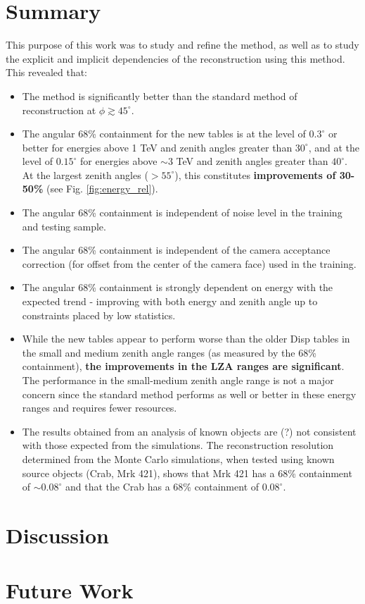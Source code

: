 \documentclass[main.tex]{subfiles}
\begin{document}
\section{Summary}
This purpose of this work was to study and refine the \disp method, as well as to study the explicit and implicit dependencies of the reconstruction using this method. This revealed that:

\begin{itemize}
\item The \disp method is significantly better than the standard method of reconstruction at $\phi\gtrsim45^\circ$.
\item The angular 68\% containment for the new \disp tables is at the level of $0.3^\circ$ or better for energies above 1 TeV and zenith angles greater than $30^\circ$, and at the level of $0.15^\circ$ for energies above $\sim$3 TeV and zenith angles greater than $40^\circ$. At the largest zenith angles ($>55^\circ$), this constitutes {\bf improvements of 30-50\%} (see Fig. \ref{fig:energy_rel}).
\item The angular 68\% containment is independent of noise level in the training and testing sample.
\item The angular 68\% containment is independent of the camera acceptance correction (for offset from the center of the camera face) used in the training.
\item The angular 68\% containment is strongly dependent on energy with the expected trend - improving with both energy and zenith angle up to constraints placed by low statistics.
\item While the new \disp tables appear to perform worse than the older Disp tables in the small and medium zenith angle ranges (as measured by the 68\% containment), \textbf{the improvements in the LZA ranges are significant}. The performance in the small-medium zenith angle range is not a major concern since the standard method performs as well or better in these energy ranges and requires fewer resources.
\item The results obtained from an analysis of known objects are (?)  not consistent with those expected from the simulations. The reconstruction resolution determined from the Monte Carlo simulations, when tested using known source objects (Crab, Mrk 421), shows that Mrk 421 has a 68\% containment of $\sim 0.08^\circ$ and that the Crab has a 68\% containment of $0.08^\circ$.
\end{itemize}

\section{Discussion}


\section{Future Work}
\end{document}
